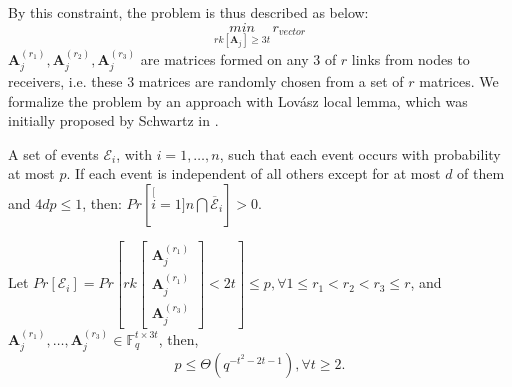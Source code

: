 By this constraint, the problem is thus described as below:
\[
\underset{rk\left[\boldsymbol{A}_{j}\right]\geq3t}{min}\,r_{vector}
\]
$\boldsymbol{A}_{j}^{\left(r_{1}\right)},\boldsymbol{A}_{j}^{\left(r_{2}\right)},\boldsymbol{A}_{j}^{\left(r_{3}\right)}$
are matrices formed on any 3 of $r$ links from nodes to receivers,
i.e. these 3 matrices are randomly chosen from a set of $r$ matrices.
We formalize the problem by an approach with Lov\'asz local lemma,
which was initially proposed by Schwartz in \cite{MosheSchwartz:2018}.
\begin{lem}
 A set of events $\mathcal{E}_{i}$, with $i=1,\ldots,n$, such that
each event occurs with probability at most $p$. If each event is
independent of all others except for at most $d$ of them and $4dp\leq1$,
then: $Pr\left[\stackrel[i=1]{n}{\bigcap}\overline{\mathcal{E}}_{i}\right]>0$.
\label{thm:LLL}
\end{lem}
%
\begin{lem}
\label{lem:prob_p_LLL_formula} Let $Pr\left[\mathcal{E}_{i}\right]=Pr\left[rk\left[\begin{array}{c}
\boldsymbol{A}_{j}^{\left(r_{1}\right)}\\
\boldsymbol{A}_{j}^{\left(r_{1}\right)}\\
\boldsymbol{A}_{j}^{\left(r_{3}\right)}
\end{array}\right]<2t\right]\leq p,\forall1\leq r_{1}<r_{2}<r_{3}\leq r$, and $\boldsymbol{A}_{j}^{\left(r_{1}\right)},\ldots,\boldsymbol{A}_{j}^{\left(r_{3}\right)}\in\ensuremath{\mathbb{F}}_{q}^{t\times3t}$,
then, 
\[
p\leq\Theta\left(q^{-t^{2}-2t-1}\right),\forall t\geq2.
\]
\end{lem}
